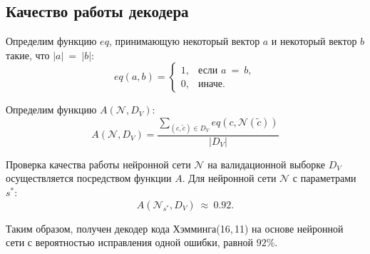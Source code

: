 \subsection{Качество работы декодера}\label{subsec:accuracy}

Определим функцию $eq$, принимающую некоторый вектор $a$ и некоторый вектор $b$ такие, что $|a|~=~|b|$:
\begin{equation}\label{eq:equal}
    eq(a, b) =
    \begin{cases}
        1, & \mbox{если } a~=~b, \\
        0, & \mbox{иначе}.
    \end{cases}
\end{equation}

Определим функцию $A(\mathcal{N}, D_V)$:
\begin{equation}\label{eq:accuracy}
    A(\mathcal{N}, D_V) = \frac{\sum\limits_{(c, \widetilde{c})\in D_V}eq(c, \mathcal{N}(\widetilde{c}))}{|D_V|}
\end{equation}

Проверка качества работы нейронной сети $\mathcal{N}$ на валидационной выборке $D_V$ осуществляется посредством функции $A$. Для нейронной сети $\mathcal{N}$ с параметрами $s^*$:
\begin{equation}\label{eq:final_accuracy}
  A(\mathcal{N}_{s^*}, D_V)~\approx~0.92.
\end{equation}

Таким образом, получен декодер кода Хэмминга(16,\,11) на основе нейронной сети с вероятностью исправления одной ошибки, равной $92 \%$.
